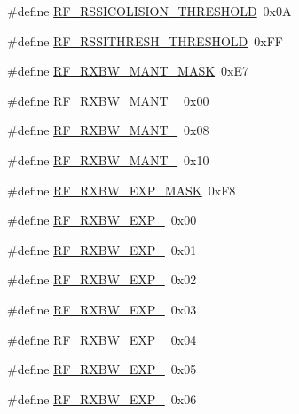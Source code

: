 \begin{DoxyCompactItemize}
\item 
\#define \mbox{\hyperlink{sx1276_regs-_fsk_8h_ad81b4cc0e3351a069dc394f00a68b24b}{R\+F\+\_\+\+R\+S\+S\+I\+C\+O\+L\+I\+S\+I\+O\+N\+\_\+\+T\+H\+R\+E\+S\+H\+O\+LD}}~0x0A
\item 
\#define \mbox{\hyperlink{sx1276_regs-_fsk_8h_ae89a3fe6abf9275ab02fa1ab30aefb8d}{R\+F\+\_\+\+R\+S\+S\+I\+T\+H\+R\+E\+S\+H\+\_\+\+T\+H\+R\+E\+S\+H\+O\+LD}}~0x\+FF
\item 
\#define \mbox{\hyperlink{sx1276_regs-_fsk_8h_acd14c73e628d64f102dbe34390ab20d5}{R\+F\+\_\+\+R\+X\+B\+W\+\_\+\+M\+A\+N\+T\+\_\+\+M\+A\+SK}}~0x\+E7
\item 
\#define \mbox{\hyperlink{sx1276_regs-_fsk_8h_a0e07506869ee3d7bb6e989c67a94f1bc}{R\+F\+\_\+\+R\+X\+B\+W\+\_\+\+M\+A\+N\+T\+\_}}~0x00
\item 
\#define \mbox{\hyperlink{sx1276_regs-_fsk_8h_a3c69e1b355ce895eb1390fc921a27d51}{R\+F\+\_\+\+R\+X\+B\+W\+\_\+\+M\+A\+N\+T\+\_}}~0x08
\item 
\#define \mbox{\hyperlink{sx1276_regs-_fsk_8h_a372ceb3b14593993f8b7f2a25220675b}{R\+F\+\_\+\+R\+X\+B\+W\+\_\+\+M\+A\+N\+T\+\_}}~0x10
\item 
\#define \mbox{\hyperlink{sx1276_regs-_fsk_8h_ab161ca7f3051baf8f6f27a4f177db024}{R\+F\+\_\+\+R\+X\+B\+W\+\_\+\+E\+X\+P\+\_\+\+M\+A\+SK}}~0x\+F8
\item 
\#define \mbox{\hyperlink{sx1276_regs-_fsk_8h_abcc6bb74aa70ef98f9ebe7a145598c69}{R\+F\+\_\+\+R\+X\+B\+W\+\_\+\+E\+X\+P\+\_}}~0x00
\item 
\#define \mbox{\hyperlink{sx1276_regs-_fsk_8h_a96e6aefdfd02d7b9c56bd3cc2ccee993}{R\+F\+\_\+\+R\+X\+B\+W\+\_\+\+E\+X\+P\+\_}}~0x01
\item 
\#define \mbox{\hyperlink{sx1276_regs-_fsk_8h_ac6ae039c9acf780cf56782004f273e1e}{R\+F\+\_\+\+R\+X\+B\+W\+\_\+\+E\+X\+P\+\_}}~0x02
\item 
\#define \mbox{\hyperlink{sx1276_regs-_fsk_8h_a9c4a24cd2f131d5b4222ae0081f90add}{R\+F\+\_\+\+R\+X\+B\+W\+\_\+\+E\+X\+P\+\_}}~0x03
\item 
\#define \mbox{\hyperlink{sx1276_regs-_fsk_8h_a1df24f4f0853faae82bab62e77a81478}{R\+F\+\_\+\+R\+X\+B\+W\+\_\+\+E\+X\+P\+\_}}~0x04
\item 
\#define \mbox{\hyperlink{sx1276_regs-_fsk_8h_a6b7bec394371c0536f76fc58836b2b99}{R\+F\+\_\+\+R\+X\+B\+W\+\_\+\+E\+X\+P\+\_}}~0x05
\item 
\#define \mbox{\hyperlink{sx1276_regs-_fsk_8h_a720c06b4d807792b0a75073b3f826c9f}{R\+F\+\_\+\+R\+X\+B\+W\+\_\+\+E\+X\+P\+\_}}~0x06

\end{DoxyCompactItemize}
